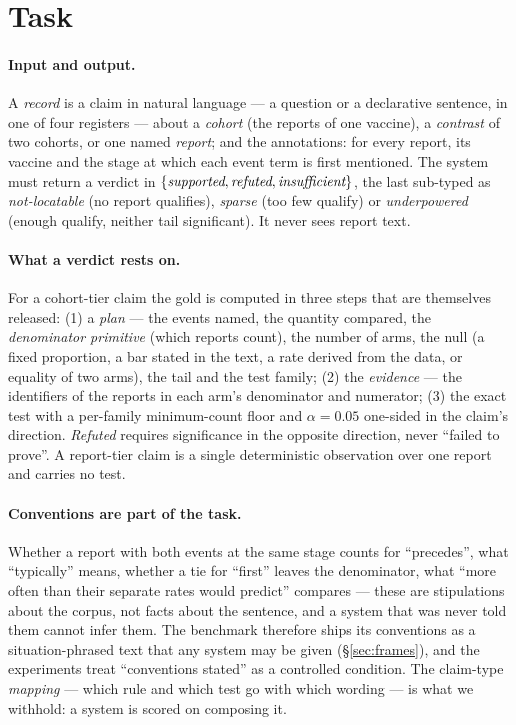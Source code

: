 \section{Task}
\label{sec:task}

\paragraph{Input and output.} A \emph{record} is a claim in natural language
--- a question or a declarative sentence, in one of four registers --- about a
\emph{cohort} (the reports of one vaccine), a \emph{contrast} of two cohorts, or
one named \emph{report}; and the annotations: for every report, its vaccine
and the stage at which each event term is first mentioned. The system must
return a verdict in $\{\emph{supported}, \emph{refuted}, \emph{insufficient}\}$,
the last sub-typed as \emph{not-locatable} (no report qualifies),
\emph{sparse} (too few qualify) or \emph{underpowered} (enough qualify, neither
tail significant). It never sees report text.

\paragraph{What a verdict rests on.} For a cohort-tier claim the gold is
computed in three steps that are themselves released: (1) a \emph{plan} ---
the events named, the quantity compared, the \emph{denominator primitive}
(which reports count), the number of arms, the null (a fixed proportion, a bar
stated in the text, a rate derived from the data, or equality of two arms), the
tail and the test family; (2) the \emph{evidence} --- the identifiers of the
reports in each arm's denominator and numerator; (3) the exact test with a
per-family minimum-count floor and $\alpha = 0.05$ one-sided in the claim's
direction. \emph{Refuted} requires significance in the opposite direction, never
``failed to prove''. A report-tier claim is a single deterministic observation
over one report and carries no test.

\paragraph{Conventions are part of the task.} Whether a report with both
events at the same stage counts for ``precedes'', what ``typically'' means,
whether a tie for ``first'' leaves the denominator, what ``more often than their
separate rates would predict'' compares --- these are stipulations about the
corpus, not facts about the sentence, and a system that was never told them
cannot infer them. The benchmark therefore ships its conventions as a
situation-phrased text that any system may be given (\S\ref{sec:frames}), and
the experiments treat ``conventions stated'' as a controlled condition. The
claim-type \emph{mapping} --- which rule and which test go with which wording
--- is what we withhold: a system is scored on composing it.

